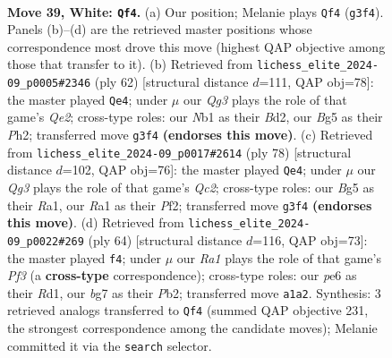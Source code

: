 \documentclass[11pt]{article}
\begin{document}
\clearpage

\begin{figure}[p]\centering
\begin{subfigure}{0.46\textwidth}\centering
\resizebox{\linewidth}{!}{%
\newchessgame
\chessboard[
  setfen={r1b1k3/6bp/1q2p3/p2p1pB1/P1np3P/5NQ1/1P3P2/RN1R1K2 w - - 0 39},
  showmover=false,
  pgfstyle=straightmove, color=movearrow, markmove={g3-f4}
]}
\caption{}
\end{subfigure}\hfill
\begin{subfigure}{0.46\textwidth}\centering
\resizebox{\linewidth}{!}{%
\newchessgame
\chessboard[
  setfen={1r4k1/2b2pp1/2p3q1/p2n3p/P1NP4/2P2PP1/3BQ2P/2R3K1 w - - 0 32},
  showmover=false,
  pgfstyle=straightmove, color=movearrow, markmove={e2-e4}
]}
\caption{}
\end{subfigure}
\\[4pt]
\begin{subfigure}{0.46\textwidth}\centering
\resizebox{\linewidth}{!}{%
\newchessgame
\chessboard[
  setfen={r3bb1k/2q3p1/5p1p/p3p3/P1P5/2B1P2P/2QN1PP1/R5K1 w - - 7 40},
  showmover=false,
  pgfstyle=straightmove, color=movearrow, markmove={c2-e4}
]}
\caption{}
\end{subfigure}\hfill
\begin{subfigure}{0.46\textwidth}\centering
\resizebox{\linewidth}{!}{%
\newchessgame
\chessboard[
  setfen={6k1/3q2pp/1pr2p2/1N1p4/rbpP4/1n3P1P/1PR1QBP1/3R2K1 w - - 0 33},
  showmover=false,
  pgfstyle=straightmove, color=movearrow, markmove={f3-f4}
]}
\caption{}
\end{subfigure}
\caption{\textbf{Move 39, White: \texttt{Qf4}.} (a) Our position; Melanie plays \texttt{Qf4} (\texttt{g3f4}). Panels (b)--(d) are the retrieved master positions whose correspondence most drove this move (highest QAP objective among those that transfer to it). (b) Retrieved from \texttt{lichess\_elite\_2024-09\_p0005\#2346} (ply 62) [structural distance $d$=111, QAP obj=78]: the master played \texttt{Qe4}; under $\mu$ our \emph{Qg3} plays the role of that game's \emph{Qe2}; cross-type roles: our \emph{N}b1 as their \emph{B}d2, our \emph{B}g5 as their \emph{P}h2; transferred move \texttt{g3f4} \textbf{(endorses this move)}. (c) Retrieved from \texttt{lichess\_elite\_2024-09\_p0017\#2614} (ply 78) [structural distance $d$=102, QAP obj=76]: the master played \texttt{Qe4}; under $\mu$ our \emph{Qg3} plays the role of that game's \emph{Qc2}; cross-type roles: our \emph{B}g5 as their \emph{R}a1, our \emph{R}a1 as their \emph{P}f2; transferred move \texttt{g3f4} \textbf{(endorses this move)}. (d) Retrieved from \texttt{lichess\_elite\_2024-09\_p0022\#269} (ply 64) [structural distance $d$=116, QAP obj=73]: the master played \texttt{f4}; under $\mu$ our \emph{Ra1} plays the role of that game's \emph{Pf3} (a \textbf{cross-type} correspondence); cross-type roles: our \emph{p}e6 as their \emph{R}d1, our \emph{b}g7 as their \emph{P}b2; transferred move \texttt{a1a2}. Synthesis: 3 retrieved analogs transferred to \texttt{Qf4} (summed QAP objective 231, the strongest correspondence among the candidate moves); Melanie committed it via the \texttt{search} selector.}
\label{fig:thought-m76}
\end{figure}
\end{document}
